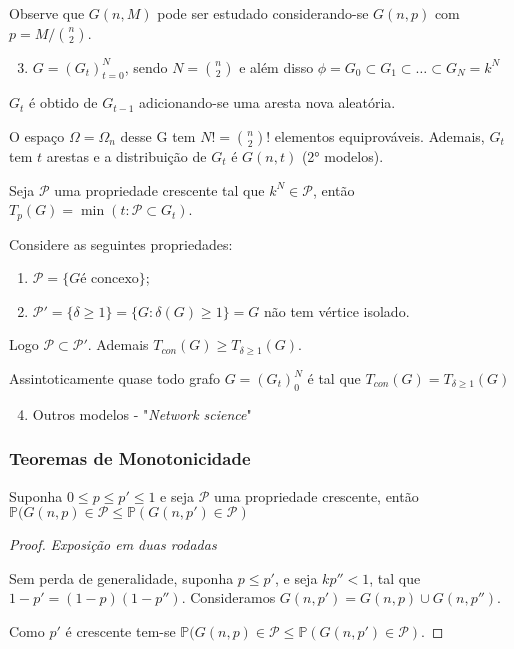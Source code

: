 Observe que $G(n,M)$ pode ser estudado considerando-se $G(n,p)$ com $p = M / \binom{n}{2}$.


\begin{enumerate}    
\setcounter{enumi}{2}
    \item $G = (G_t)_{t = 0}^N$, sendo $N = \binom{n}{2}$ e além disso $\phi = G_0 \subset G_1 \subset \dots \subset G_N = k^N$
\end{enumerate}

$G_t$ é obtido de $G_{t-1}$ adicionando-se uma aresta nova aleatória.

O espaço $\Omega = \Omega_n$ desse G tem $N! = \binom{n}{2}!$ elementos equiprováveis. Ademais, $G_t$ tem $t$ arestas e a distribuição de $G_t$ é $G(n, t)$ (2° modelos).

\begin{exemplo}
Seja $\mathcal{P}$ uma propriedade crescente tal que $k^N \in \mathcal{P}$, então $T_p(G) = \min(t:\mathcal{P} \subset G_t )$.

Considere as seguintes propriedades:
\begin{enumerate}
    \item $\mathcal{P} = \{G \text{é concexo}\}$;
    \item $\mathcal{P}' = \{\delta \geq 1\} = \{G: \delta(G) \geq 1\} = G$ não tem vértice isolado.
\end{enumerate}{}

Logo $\mathcal{P} \subset \mathcal{P}'$. Ademais $T_{con}(G) \geq T_{\delta \geq 1}(G)$.
\end{exemplo}
\begin{teorema}
Assintoticamente quase todo grafo $G = (G_t)_0^N$ é tal que $T_{con}(G) = T_{\delta \geq 1}(G)$
\end{teorema}{}

\begin{enumerate}
\setcounter{enumi}{3}
    \item Outros modelos - "\emph{Network science}"
\end{enumerate}{}

\subsubsection{Teoremas de Monotonicidade}
\begin{lema}
Suponha $0 \leq p \leq p' \leq 1$ e seja $\mathcal{P}$ uma propriedade crescente, então $\mathbb{P}(G(n,p) \in \mathcal{P} \leq \mathbb{P}(G(n,p') \in \mathcal{P})$
\end{lema}{}
\begin{proof}
\emph{Exposição em duas rodadas}

Sem perda de generalidade, suponha $p \leq p'$, e seja $kp{''} < 1$, tal que $1-p' = (1-p)(1 - p{''})$. Consideramos $G(n, p') = G(n, p) \cup G(n, p{''})$.

Como $p'$ é crescente tem-se $\mathbb{P}(G(n,p) \in \mathcal{P} \leq \mathbb{P}(G(n,p') \in \mathcal{P})$.
\end{proof}{}

